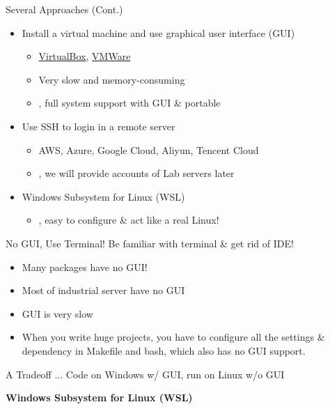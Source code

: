 \documentclass{../TexTemplate/myslide}
\begin{document}
\begin{frame}{Several Approaches (Cont.)}
\begin{itemize}[<+->]
	\item Install a virtual machine and use graphical user interface (GUI)
	\begin{itemize}
		\item \href{https://www.virtualbox.org/}{VirtualBox}, \href{https://www.vmware.com/}{VMWare}
		\item Very slow and memory-consuming
		\item \cmark, full system support with GUI \& portable
	\end{itemize}
	\item Use SSH to login in a remote server
	\begin{itemize}
		\item AWS, Azure, Google Cloud, Aliyun, Tencent Cloud
		\item \cmark, we will provide accounts of Lab servers later
	\end{itemize}
	\item Windows Subsystem for Linux (WSL)
	\begin{itemize}
		\item \cmark\cmark, easy to configure \& act like a real Linux!
	\end{itemize}
\end{itemize}
\end{frame}

\begin{frame}{No GUI, Use Terminal!}
Be familiar with terminal \& get rid of IDE!
\begin{itemize}
	\item Many packages have no GUI!
	\item Most of industrial server have no GUI
	\item GUI is very slow
	\item When you write huge projects, you have to configure all the settings \& dependency in Makefile and bash, which also has no GUI support.
\end{itemize}
\end{frame}

\begin{frame}{A Tradeoff $\ldots$}
Code on Windows w/ GUI, run on Linux w/o GUI
\begin{center}
\textbf{Windows Subsystem for Linux (WSL)}
\end{center}
\end{frame}
\end{document}
